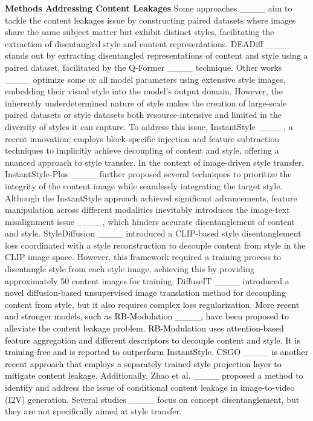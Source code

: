 \textbf{Methods Addressing Content Leakages}
Some approaches ____ aim to tackle the content leakages issue by constructing paired datasets where images share the same subject matter but exhibit distinct styles, facilitating the extraction of disentangled style and content representations. DEADiff ____ stands out by extracting disentangled representations of content and style using a paired dataset, facilitated by the Q-Former ____ technique.
Other works ____ optimize some or all model parameters using extensive style images, embedding their visual style into the model’s output domain. However, the inherently underdetermined nature of style makes the creation of large-scale paired datasets or style datasets both resource-intensive and limited in the diversity of styles it can capture. To address this issue, InstantStyle ____, a recent innovation, employs block-specific injection and feature subtraction techniques to implicitly achieve decoupling of content and style, offering a nuanced approach to style transfer. In the context of image-driven style transfer, InstantStyle-Plus ____ further proposed several techniques to prioritize the integrity of the content image while seamlessly integrating the target style. 
Although the InstantStyle approach achieved significant advancements, feature manipulation across different modalities inevitably introduces the image-text misalignment issue ____, which hinders accurate disentanglement of content and style. 
StyleDiffusion ____ introduced a CLIP-based style disentanglement loss coordinated with a style reconstruction to decouple content from style in the CLIP image space. However, this framework required a training process to disentangle style from each style image, achieving this by providing approximately 50 content images for training.
DiffuseIT ____ introduced a novel diffusion-based unsupervised image translation method for decoupling content from style, but it also requires complex loss regularization.
\textcolor{black}{More recent and stronger models, such as RB-Modulation ____, have been proposed to alleviate the content leakage problem. RB-Modulation uses attention-based feature aggregation and different descriptors to decouple content and style. It is training-free and is reported to outperform InstantStyle. CSGO ____ is another recent approach that employs a separately trained style projection layer to mitigate content leakage.}
Additionally, Zhao et al. ____ proposed a method to identify and address the issue of conditional content leakage in image-to-video (I2V) generation. Several studies ____ focus on concept disentanglement, but they are not specifically aimed at style transfer.

